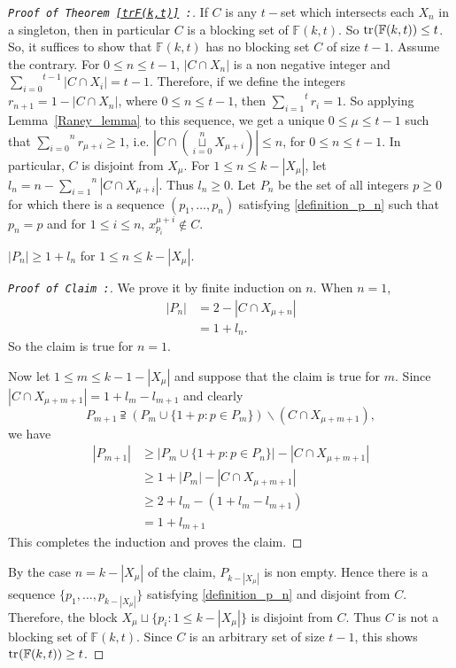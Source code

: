 \documentclass[a4paper,reqno,10pt]{amsart}
\theoremstyle{definition}
\begin{document}
\begin{proof}[\tt{Proof of Theorem~\ref{trF(k,t)}} :]
If $C$ is any $t-$set which intersects each $X_{n}$ in a singleton, then in particular $C$ is a blocking set of $\mathbb{F}(k,t)$. So ${\ensuremath{{\textnormal{tr}}_{}({\mathbb{F}(k,t)})}}\leq t$. So, it suffices to show that $\mathbb{F}(k,t)$ has no blocking set $C$ of size $t-1$. Assume the contrary. For $0\leq n\leq t-1$,  $|C\cap X_{n}|$ is a non negative integer and $\overset{t-1}{\underset{i=0}\sum}|C\cap X_{i}|=t-1$. Therefore, if we define the integers $r_{n+1}=1-|C\cap X_{n}|$, where $0\leq n\leq t-1$, then $\overset{t}{\underset{i=1}\sum}r_{i}=1$. So applying Lemma~\ref{Raney_lemma} to this sequence, we get a unique $0\leq \mu\leq t-1$ such that $\overset{n}{\underset{i=0}\sum}r_{\mu+i}\geq1$, i.e. 
$|C\cap(\overset{n}{\underset{i=0}\sqcup}X_{\mu+i})|\leq n$, for $0\leq n\leq t-1$. In particular, $C$ is disjoint from $X_{\mu}$. For $1\leq n\leq k-|X_{\mu}|$, let $l_{n}=n-\overset{n}{\underset{i=1}\sum}|C\cap X_{\mu+i}|$. Thus $l_{n}\geq0$. Let $P_{n}$ be the set of all integers $p\geq 0$ for which 
there is a sequence $(p_{1},\ldots,p_{n})$ satisfying \eqref{definition_p_n} such that $p_{n}=p$ and for $1\leq i\leq n$, $x^{\mu+i}_{p_{i}}\notin C$. 

  $|P_{n}|\geq1+l_{n}$ for $1\leq n\leq k-|X_{\mu}|$.

\begin{proof}[\tt{Proof of Claim} :]
We prove it by finite induction on $n$. When $n=1$, 
\begin{align*}
|P_{n}|&=2-|C\cap X_{\mu+n}|\\
&=1+l_{n}.
\end{align*}
So the claim is true for $n=1$.

Now let $1\leq m\leq k-1-|X_{\mu}|$ and suppose that the claim is true for $m$. Since $|C\cap X_{\mu+m+1}|=1+l_{m}-l_{m+1}$ and clearly 
\begin{equation*}
P_{m+1}\supseteqq(P_{m}\cup\{1+p:p\in P_{m}\})\smallsetminus(C\cap X_{\mu+m+1}),
\end{equation*}
we have 
\begin{align*}
|P_{m+1}|&\geq|P_{m}\cup\{1+p:p\in P_{n}\}|-|C\cap X_{\mu+m+1}|\\
&\geq 1+|P_{m}|-|C\cap X_{\mu+m+1}|\\
&\geq 2+l_{m}-(1+l_{m}-l_{m+1})\\
&=1+l_{m+1}
\end{align*}
This completes the induction and proves the claim.
\end{proof}
By the case $n=k-|X_{\mu}|$ of the claim, $P_{k-|X_{\mu}|}$ is non empty. Hence there is a sequence 
$\{p_{1},\ldots,p_{k-|X_{\mu}|}\}$ satisfying \eqref{definition_p_n} and disjoint from $C$. Therefore, the block 
$X_{\mu}\sqcup\{p_{i}:1\leq k-|X_{\mu}|\}$ is disjoint from $C$. Thus $C$ is not a blocking set of $\mathbb{F}(k,t)$. Since $C$ is an arbitrary set of size $t-1$, this shows ${\ensuremath{{\textnormal{tr}}_{}({\mathbb{F}(k,t)})}}\geq t$.
\end{proof}
\end{document}
